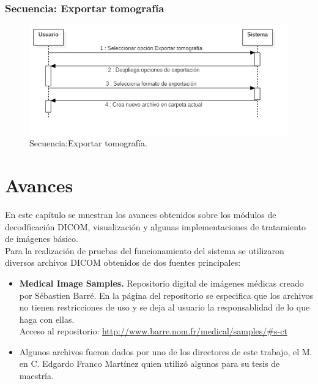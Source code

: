 \documentclass[12pt]{report}
\begin{document}
\subsection{Secuencia: Exportar tomografía}
\begin{figure}[H]
\centering
\includegraphics[width = 12 cm, height = 7 cm]{exportacion}
\caption{Secuencia:Exportar tomografía.}
\end{figure}


\chapter{Avances}
En este capítulo se muestran los avances obtenidos sobre los módulos de decodficación DICOM, visualización y algunas implementaciones de tratamiento de imágenes básico.\\

Para la realización de pruebas del funcionamiento del sistema se utilizaron diversos archivos DICOM obtenidos de dos fuentes principales:

\begin{itemize}
\item \textbf{Medical Image Samples. } Repositorio digital de imágenes médicas creado por Sébastien Barré. En la página del repositorio se especifica que los archivos no tienen restricciones de uso y se deja al usuario la responsablidad de lo que haga con ellas.\\

Acceso al repositorio: \url{http://www.barre.nom.fr/medical/samples/#s-ct}

\item Algunos archivos fueron dados por uno de los directores de este trabajo, el M. en C. Edgardo Franco Martínez quien utilizó algunos para su tesis de maestría.

\end{itemize}
\end{document}
